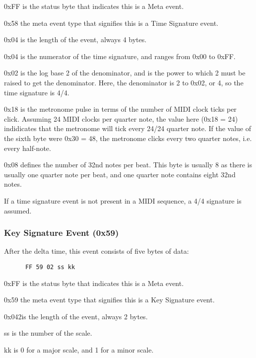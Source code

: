    \begin{enumber}
      \item 0xFF is the status byte that indicates this is a Meta event.
      \item 0x58 the meta event type that signifies this is a Time Signature
         event.
      \item 0x04 is the length of the event, always 4 bytes.
      \item 0x04 is the numerator of the time signature, and ranges from 0x00
         to 0xFF.
      \item 0x02 is the log base 2 of the denominator, and is the power to
         which 2 must be raised to get the denominator.  Here, the denominator
         is 2 to 0x02, or 4, so the time signature is 4/4.
      \item 0x18 is the metronome pulse in terms of the number of
         MIDI clock ticks per click.  Assuming 24 MIDI clocks per quarter note,
         the value here (0x18 = 24) indidicates that the metronome will tick
         every 24/24 quarter note.  If the value of the sixth byte were 0x30 =
         48, the metronome clicks every two quarter notes, i.e. every
         half-note.
      \item 0x08 defines the number of 32nd notes per beat. This byte is
         usually 8 as there is usually one quarter note per beat, and one
         quarter note contains eight 32nd notes.
   \end{enumber}

   If a time signature event is not present in a MIDI sequence, a 4/4 signature
   is assumed.


\subsubsection{Key Signature Event (0x59)}
\label{subsubsec:midi_meta_key_sig}

   After the delta time, this event consists of five bytes of data:

   \begin{verbatim}
      FF 59 02 ss kk
   \end{verbatim}

   \begin{enumber}
      \item 0xFF is the status byte that indicates this is a Meta event.
      \item 0x59 the meta event type that signifies this is a Key Signature
         event.
      \item 0x042is the length of the event, always 2 bytes.
      \item ss is the number of the scale.
      \item kk is 0 for a major scale, and 1 for a minor scale.
   \end{enumber}
   
